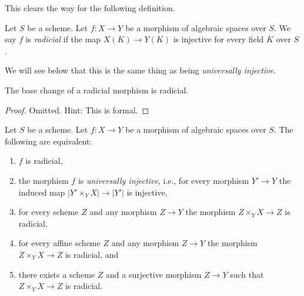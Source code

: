 \noindent
This clears the way for the following definition.

\begin{definition}
\label{definition-radicial}
Let $S$ be a scheme. Let $f : X \to Y$ be a morphism of algebraic
spaces over $S$. We say $f$ is {\it radicial}
if the map $X(K) \to Y(K)$ is injective for every field $K$ over $S$.
\end{definition}

\noindent
We will see below that this is the same thing as being {\it universally
injective}.

\begin{lemma}
\label{lemma-base-change-radicial}
The base change of a radicial morphism is radicial.
\end{lemma}

\begin{proof}
Omitted. Hint: This is formal.
\end{proof}

\begin{lemma}
\label{lemma-radicial-local}
Let $S$ be a scheme.
Let $f : X \to Y$ be a morphism of algebraic spaces over $S$.
The following are equivalent:
\begin{enumerate}
\item $f$ is radicial,
\item the morphism $f$ is {\it universally injective}, i.e.,
for every morphism $Y' \to Y$ the induced map $|Y' \times_Y X| \to |Y'|$
is injective,
\item for every scheme $Z$ and any morphism $Z \to Y$ the morphism
$Z \times_Y X \to Z$ is radicial,
\item for every affine scheme $Z$ and any morphism
$Z \to Y$ the morphism $Z \times_Y X \to Z$ is radicial, and
\item there exists a scheme $Z$ and a surjective morphism
$Z \to Y$ such that $Z \times_Y X \to Z$ is radicial.
\end{enumerate}
\end{lemma}

